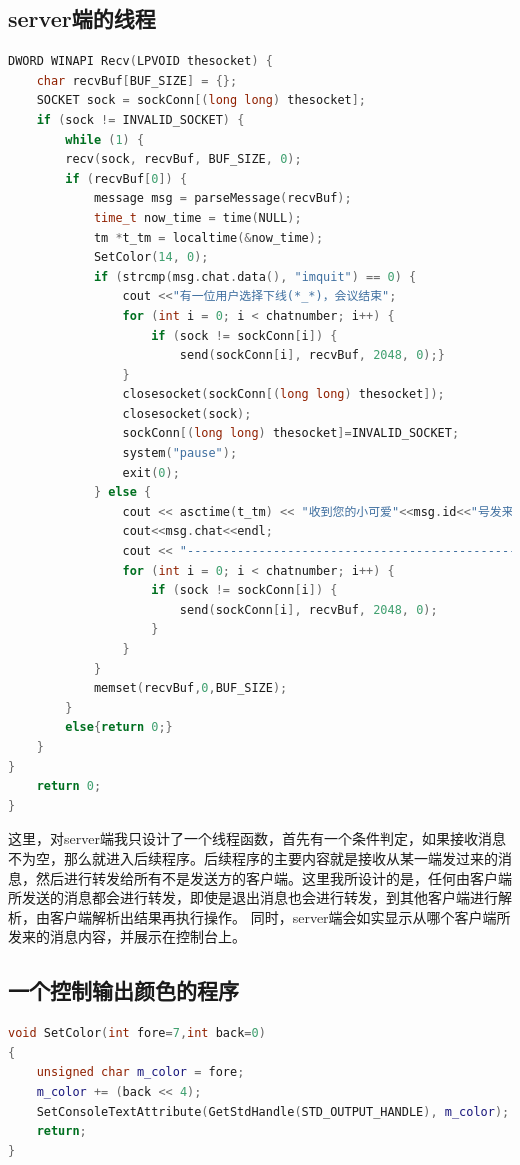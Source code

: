 \documentclass[UTF8,a4paper,10pt]{ctexart}
\begin{document}
\subsection{server端的线程}
\begin{lstlisting}[frame=trbl,language={C++}]
DWORD WINAPI Recv(LPVOID thesocket) {
    char recvBuf[BUF_SIZE] = {};
    SOCKET sock = sockConn[(long long) thesocket];
    if (sock != INVALID_SOCKET) {
        while (1) {
        recv(sock, recvBuf, BUF_SIZE, 0);
        if (recvBuf[0]) {
            message msg = parseMessage(recvBuf);
            time_t now_time = time(NULL);
            tm *t_tm = localtime(&now_time);
            SetColor(14, 0);
            if (strcmp(msg.chat.data(), "imquit") == 0) {
                cout <<"有一位用户选择下线(*_*)，会议结束";
                for (int i = 0; i < chatnumber; i++) {
                    if (sock != sockConn[i]) {
                        send(sockConn[i], recvBuf, 2048, 0);}
                }
                closesocket(sockConn[(long long) thesocket]);
                closesocket(sock);
                sockConn[(long long) thesocket]=INVALID_SOCKET;
                system("pause");
                exit(0);
            } else {
                cout << asctime(t_tm) << "收到您的小可爱"<<msg.id<<"号发来的消息:";
                cout<<msg.chat<<endl;
                cout << "-------------------------------------------------------------" << endl;
                for (int i = 0; i < chatnumber; i++) {
                    if (sock != sockConn[i]) {
                        send(sockConn[i], recvBuf, 2048, 0);
                    }
                }
            }
            memset(recvBuf,0,BUF_SIZE);
        }
        else{return 0;}
    }
}
    return 0;
}
\end{lstlisting}

这里，对server端我只设计了一个线程函数，首先有一个条件判定，如果接收消息不为空，那么就进入后续程序。后续程序的主要内容就是接收从某一端发过来的消息，然后进行转发给所有不是发送方的客户端。这里我所设计的是，任何由客户端所发送的消息都会进行转发，即使是退出消息也会进行转发，到其他客户端进行解析，由客户端解析出结果再执行操作。
同时，server端会如实显示从哪个客户端所发来的消息内容，并展示在控制台上。
\subsection{一个控制输出颜色的程序}
\begin{lstlisting}[frame=trbl,language={C++}]
void SetColor(int fore=7,int back=0)
{
    unsigned char m_color = fore;
    m_color += (back << 4);
    SetConsoleTextAttribute(GetStdHandle(STD_OUTPUT_HANDLE), m_color);
    return;
}
\end{lstlisting}
\end{document}
